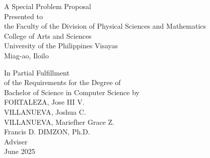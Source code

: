 \begin{titlepage}
    \centering
    
    
    \vspace{1cm}
    A Special Problem Proposal\\
    Presented to\\
    the Faculty of the Division of Physical Sciences and Mathematics\\
    College of Arts and Sciences\\
    University of the Philippines Visayas\\
    Miag-ao, Iloilo
    
    \vspace{1cm}
    In Partial Fulfillment\\
    of the Requirements for the Degree of\\
    Bachelor of Science in Computer Science
    \vspace{1cm}
    by\\
    
    \vspace{1cm}
    FORTALEZA, Jose III V. \\
    VILLANUEVA, Joshua C.  \\
    VILLANUEVA, Mariefher Grace Z.  \\
    
    \vspace{1cm}
    Francis D. DIMZON, Ph.D. \\
    Adviser\\
    
    
    \vspace{1.75cm}
    June 2025
    \end{titlepage}